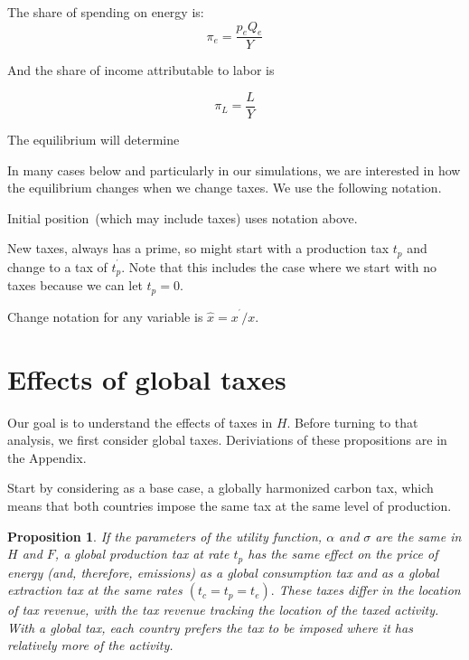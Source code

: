 \documentclass[notitlepage,12pt]{article}
\newtheorem{proposition}[theorem]{Proposition}
\begin{document}
The share of spending on energy is:%
\begin{equation*}
\pi _{e}=\frac{p_{e}Q_{e}}{Y}
\end{equation*}

And the share of income attributable to labor is 

\begin{equation*}
\pi _{L}=\frac{L}{Y}
\end{equation*}

The equilibrium will determine 

\bigskip 

In many cases below and particularly in our simulations, we are interested
in how the equilibrium changes when we change taxes. We use the following
notation.

Initial position\ (which may include taxes) uses notation above.

New taxes, always has a prime, so might start with a production tax $t_{p}$
and change to a tax of $t_{p}^{^{\prime }}$. Note that this includes the
case where we start with no taxes because we can let $t_{p}=0$.

Change notation for any variable is $\hat{x}=x^{^{\prime }}/x$.

\section{Effects of global taxes}

Our goal is to understand the effects of taxes in $H$. Before turning to
that analysis, we first consider global taxes. Deriviations of these
propositions are in the Appendix.

Start by considering as a base case, a globally harmonized carbon tax, which
means that both countries impose the same tax at the same level of
production.

\begin{proposition}
If the parameters of the utility function, $\alpha $ and $\sigma $ are the
same in $H$ and $F$, a global production tax at rate $t_{p}$ has the same
effect on the price of energy (and, therefore, emissions) as a global
consumption tax and as a global extraction tax at the same rates $\left(
t_{c}=t_{p}=t_{e}\right) .$ These taxes differ in the location of tax
revenue, with the tax revenue tracking the location of the taxed activity.
With a global tax, each country prefers the tax to be imposed where it has
relatively more of the activity.
\end{proposition}
\end{document}
